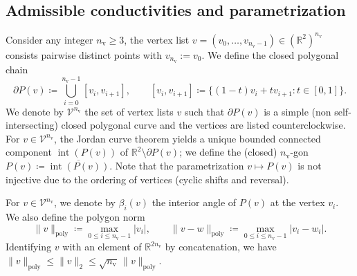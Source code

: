 \documentclass{article}
\newcommand{\R}{\mathbb{R}}
\begin{document}
\subsection{Admissible conductivities and parametrization}\label{sec:K-and-param}

Consider any integer $n_{\mathrm v}\ge 3$,
the vertex list $v=(v_0,\dots,v_{n_{\mathrm v}-1})\in(\R^2)^{n_{\mathrm v}}$ consists pairwise distinct points with $v_{n_{\mathrm v}}:=v_0$. We define the closed polygonal chain
\[
\partial P(v)\coloneqq \bigcup_{i=0}^{n_{\mathrm v}-1}[v_i,v_{i+1}],
\qquad
[v_i,v_{i+1}]\coloneqq \{(1-t)v_i+t v_{i+1}:t\in[0,1]\}.
\]
We denote by $\mathcal V^{n_{\mathrm v}}$ the set of vertex lists $v$ such that $\partial P(v)$ is a
simple (non self-intersecting) closed polygonal curve and the vertices are listed counterclockwise.
For $v\in\mathcal V^{n_{\mathrm v}}$, the Jordan curve theorem yields a unique bounded connected component
$\operatorname{int}(P(v))$ of $\R^2\setminus \partial P(v)$; we define the (closed) $n_{\mathrm v}$-gon $P(v)\coloneqq \overline{\operatorname{int}(P(v))}$. Note that the parametrization $v\mapsto P(v)$ is not injective due to the ordering of vertices (cyclic shifts and reversal).

For $v\in\mathcal V^{n_{\mathrm v}}$, we denote by $\beta_i(v)$
the interior angle of $P(v)$ at the vertex $v_i$. We also define the polygon norm
\[
\|v\|_{\mathrm{poly}}\coloneqq \max_{0\le i\le n_{\mathrm v}-1}|v_i|,
\qquad
\|v-w\|_{\mathrm{poly}}\coloneqq \max_{0\le i\le n_{\mathrm v}-1}|v_i-w_i|.
\]
Identifying $v$ with an element of $\R^{2n_{\mathrm v}}$ by concatenation, we have
$\|v\|_{\mathrm{poly}}\le \|v\|_2 \le \sqrt{n_{\mathrm v}}\,\|v\|_{\mathrm{poly}}$.
\end{document}
